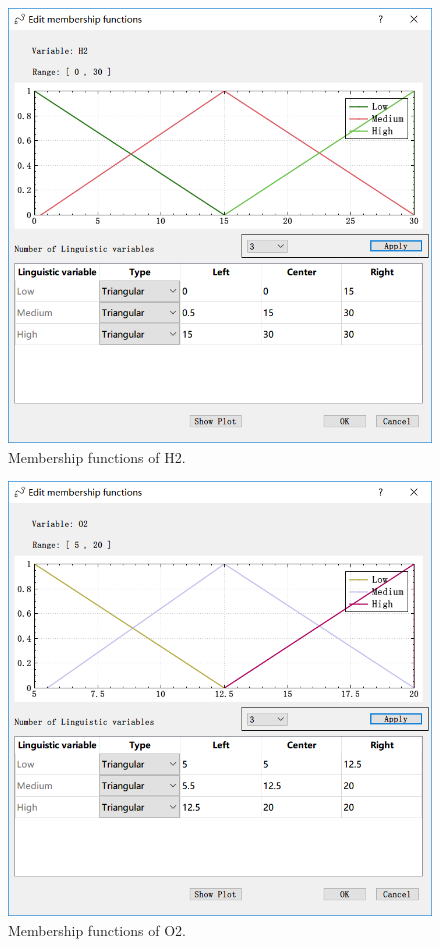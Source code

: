\documentclass[journal,a4paper,onecolumn]{article}
\begin{document}
\begin{figure}[!hbt]
	\begin{center}
		\includegraphics[width=0.7\columnwidth]{fig9}
		\caption{Membership functions of H2.}
		\label{fig:Membership functions of H2}
	\end{center}
\end{figure}
\begin{figure}[!hbt]
	\begin{center}
		\includegraphics[width=0.7\columnwidth]{fig9_1}
		\caption{Membership functions of O2.}
		\label{fig:Membership functions of O2}
	\end{center}
\end{figure}
\end{document}
